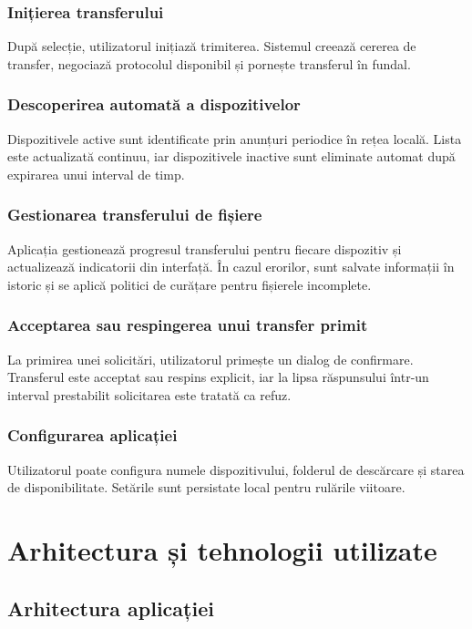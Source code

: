 \documentclass[12pt,a4paper]{report}
\begin{document}
\subsection*{Inițierea transferului}
După selecție, utilizatorul inițiază trimiterea. Sistemul creează cererea de transfer, negociază protocolul disponibil și pornește transferul în fundal.

\subsection*{Descoperirea automată a dispozitivelor}
Dispozitivele active sunt identificate prin anunțuri periodice în rețea locală. Lista este actualizată continuu, iar dispozitivele inactive sunt eliminate automat după expirarea unui interval de timp.

\subsection*{Gestionarea transferului de fișiere}
Aplicația gestionează progresul transferului pentru fiecare dispozitiv și actualizează indicatorii din interfață. În cazul erorilor, sunt salvate informații în istoric și se aplică politici de curățare pentru fișierele incomplete.

\subsection*{Acceptarea sau respingerea unui transfer primit}
La primirea unei solicitări, utilizatorul primește un dialog de confirmare. Transferul este acceptat sau respins explicit, iar la lipsa răspunsului într-un interval prestabilit solicitarea este tratată ca refuz.

\subsection*{Configurarea aplicației}
Utilizatorul poate configura numele dispozitivului, folderul de descărcare și starea de disponibilitate. Setările sunt persistate local pentru rulările viitoare.

\newpage
\chapter{Arhitectura și tehnologii utilizate}

\section*{Arhitectura aplicației}
\end{document}
